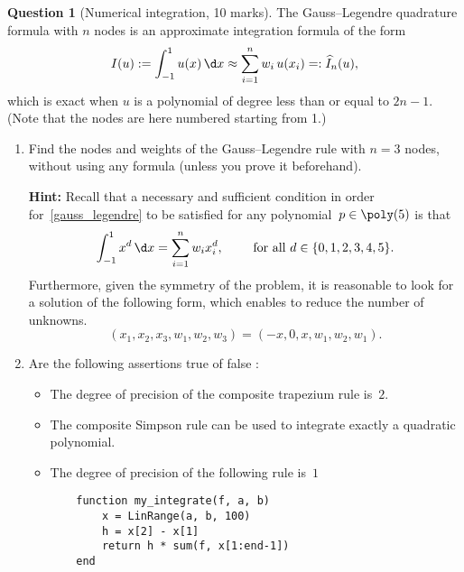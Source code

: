 \documentclass[10pt]{article}
\theoremstyle{definition}
\newtheorem{question}{Question}
\theoremstyle{remark}
\begin{document}
\newpage
\begin{question}
    [Numerical integration, 10 marks]
    The Gauss--Legendre quadrature formula with $n$ nodes is an approximate integration formula of the form
    \begin{equation}
        \label{gauss_legendre}
        I(u) := \int_{-1}^{1} u(x) \, \d x \approx \sum_{i=1}^{n} w_i \, u(x_i) =: \widehat I_n(u),
    \end{equation}
    which is exact when $u$ is a polynomial of degree less than or equal to $2n-1$.
    (Note that the nodes are here numbered starting from 1.)

    \begin{enumerate}
        \item
            Find the nodes and weights of the Gauss--Legendre rule with $n=3$ nodes,
            without using any formula (unless you prove it beforehand).

            \textbf{Hint:}
            Recall that a necessary and sufficient condition in order for~\eqref{gauss_legendre} to be satisfied for any polynomial~$p \in \poly(5)$ is that
            \[
                \int_{-1}^{1} x^d \, \d x= \sum_{i=1}^{n} w_i x_i^d,
                \qquad \text{ for all $d \in \{0, 1, 2, 3, 4, 5\}$}.
            \]
            Furthermore, given the symmetry of the problem,
            it is reasonable to look for a solution of the following form,
            which enables to reduce the number of unknowns.
            \[
                (x_1, x_2, x_3, w_1, w_2, w_3)
                = (-x, 0, x, w_1, w_2, w_1).
            \]

        \item {} Are the following assertions true of false :
            \begin{itemize}
                \item
                    The degree of precision of the composite trapezium rule is~$2$.

                \item
                    The composite Simpson rule can be used to integrate exactly a quadratic polynomial.

                \item
                    The degree of precision of the following rule is~$1$
            \begin{verbatim}
    function my_integrate(f, a, b)
        x = LinRange(a, b, 100)
        h = x[2] - x[1]
        return h * sum(f, x[1:end-1])
    end
            \end{verbatim}


\end{itemize}
\end{enumerate}
\end{question}
\end{document}
